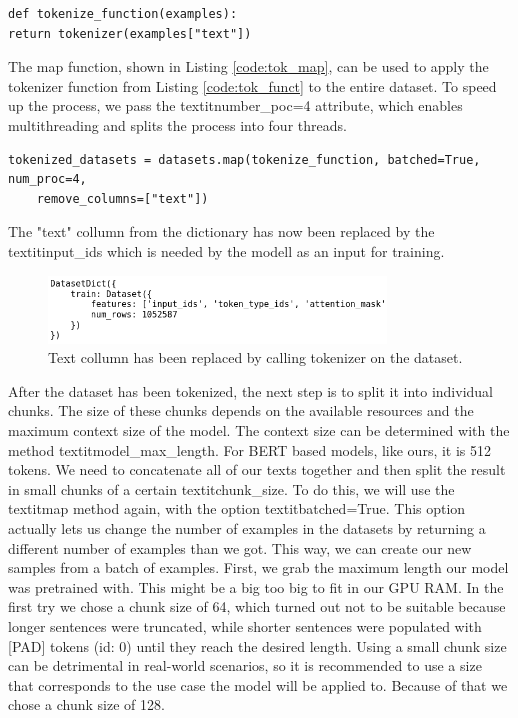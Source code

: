 \begin{code}
	\label{code:tok_funct}
	\begin{verbatim}
def tokenize_function(examples):
return tokenizer(examples["text"])
	\end{verbatim}
\end{code}

The map function, shown in Listing \ref{code:tok_map}, can be used to apply the tokenizer function from Listing \ref{code:tok_funct} to the entire dataset. To speed up the process, we pass the textit{number\_poc=4} attribute, which enables multithreading and splits the process into four threads.

\begin{code}
	\label{code:tok_map}
	\begin{verbatim}
tokenized_datasets = datasets.map(tokenize_function, batched=True, num_proc=4, 
	remove_columns=["text"])
	\end{verbatim}
\end{code}

The "text" collumn from the dictionary has now been replaced by the textit{input\_ids} which is needed by the modell as an input for training.

\begin{figure}[H]
	\centering
	\includegraphics[width=0.8\textwidth]{figures/tok_dataset.png}
	\caption{Text collumn has been replaced by calling tokenizer on the dataset.}
	\label{fig:dict_tokenized}
\end{figure}

After the dataset has been tokenized, the next step is to split it into individual chunks. The size of these chunks depends on the available resources and the maximum context size of the model. The context size can be determined with the method textit{model\_max\_length}. For BERT based models, like ours, it is 512 tokens.
We need to concatenate all of our texts together and then split the result in small chunks of a certain textit{chunk\_size}. To do this, we will use the textit{map} method again, with the option textit{batched=True}. This option actually lets us change the number of examples in the datasets by returning a different number of examples than we got. This way, we can create our new samples from a batch of examples.\newline
First, we grab the maximum length our model was pretrained with. This might be a big too big to fit in our GPU RAM. In the first try we chose a chunk size of 64, which turned out not to be suitable because longer sentences were truncated, while shorter sentences were populated with [PAD] tokens (id: 0) until they reach the desired length. Using a small chunk size can be detrimental in real-world scenarios, so it is recommended to use a size that corresponds to the use case the model will be applied to. Because of that we chose a chunk size of 128.

